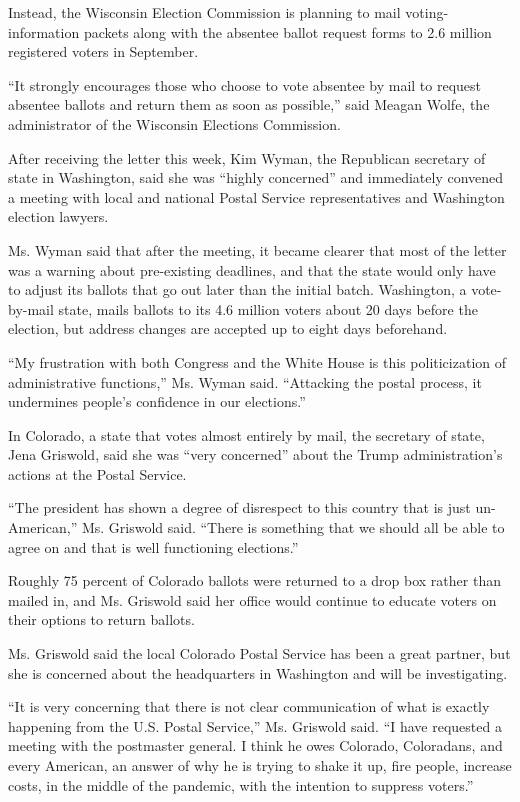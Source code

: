 Instead, the Wisconsin Election Commission is planning to mail
voting-information packets along with the absentee ballot request forms
to 2.6 million registered voters in September.

``It strongly encourages those who choose to vote absentee by mail to
request absentee ballots and return them as soon as possible,'' said
Meagan Wolfe, the administrator of the Wisconsin Elections Commission.

After receiving the letter this week, Kim Wyman, the Republican
secretary of state in Washington, said she was ``highly concerned'' and
immediately convened a meeting with local and national Postal Service
representatives and Washington election lawyers.

Ms. Wyman said that after the meeting, it became clearer that most of
the letter was a warning about pre-existing deadlines, and that the
state would only have to adjust its ballots that go out later than the
initial batch. Washington, a vote-by-mail state, mails ballots to its
4.6 million voters about 20 days before the election, but address
changes are accepted up to eight days beforehand.

``My frustration with both Congress and the White House is this
politicization of administrative functions,'' Ms. Wyman said.
``Attacking the postal process, it undermines people's confidence in our
elections.''

In Colorado, a state that votes almost entirely by mail, the secretary
of state, Jena Griswold, said she was ``very concerned'' about the Trump
administration's actions at the Postal Service.

``The president has shown a degree of disrespect to this country that is
just un-American,'' Ms. Griswold said. ``There is something that we
should all be able to agree on and that is well functioning elections.''

Roughly 75 percent of Colorado ballots were returned to a drop box
rather than mailed in, and Ms. Griswold said her office would continue
to educate voters on their options to return ballots.

Ms. Griswold said the local Colorado Postal Service has been a great
partner, but she is concerned about the headquarters in Washington and
will be investigating.

``It is very concerning that there is not clear communication of what is
exactly happening from the U.S. Postal Service,'' Ms. Griswold said. ``I
have requested a meeting with the postmaster general. I think he owes
Colorado, Coloradans, and every American, an answer of why he is trying
to shake it up, fire people, increase costs, in the middle of the
pandemic, with the intention to suppress voters.''

